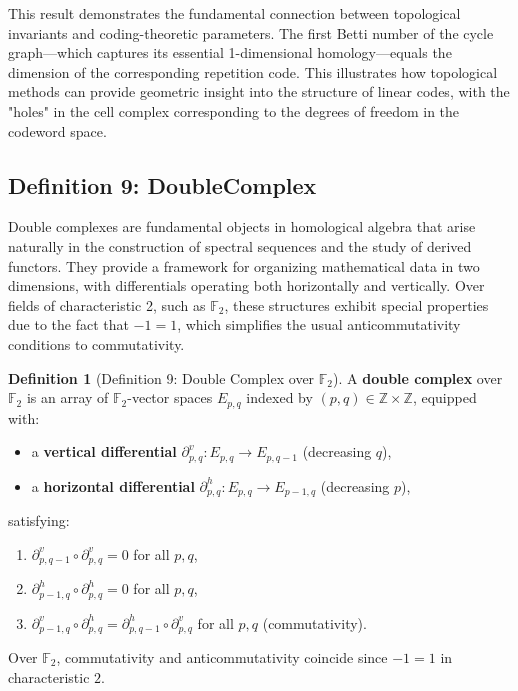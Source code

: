 \documentclass[11pt]{article}
\theoremstyle{plain}
\theoremstyle{definition}
\newtheorem*{definition}{Definition}
\theoremstyle{remark}
\begin{document}
This result demonstrates the fundamental connection between topological invariants and coding-theoretic parameters. The first Betti number of the cycle graph—which captures its essential 1-dimensional homology—equals the dimension of the corresponding repetition code. This illustrates how topological methods can provide geometric insight into the structure of linear codes, with the "holes" in the cell complex corresponding to the degrees of freedom in the codeword space.

\vspace{1em}

\subsection{Definition 9: DoubleComplex}

Double complexes are fundamental objects in homological algebra that arise naturally in the construction of spectral sequences and the study of derived functors. They provide a framework for organizing mathematical data in two dimensions, with differentials operating both horizontally and vertically. Over fields of characteristic 2, such as $\mathbb{F}_2$, these structures exhibit special properties due to the fact that $-1 = 1$, which simplifies the usual anticommutativity conditions to commutativity.

\begin{definition}[Definition 9: Double Complex over $\mathbb{F}_2$]
A \textbf{double complex} over $\mathbb{F}_2$ is an array of $\mathbb{F}_2$-vector spaces $E_{p,q}$ indexed by $(p,q) \in \mathbb{Z} \times \mathbb{Z}$, equipped with:
\begin{itemize}
    \item a \textbf{vertical differential} $\partial^v_{p,q} : E_{p,q} \to E_{p,q-1}$ (decreasing $q$),
    \item a \textbf{horizontal differential} $\partial^h_{p,q} : E_{p,q} \to E_{p-1,q}$ (decreasing $p$),
\end{itemize}
satisfying:
\begin{enumerate}
    \item $\partial^v_{p,q-1} \circ \partial^v_{p,q} = 0$ for all $p, q$,
    \item $\partial^h_{p-1,q} \circ \partial^h_{p,q} = 0$ for all $p, q$,
    \item $\partial^v_{p-1,q} \circ \partial^h_{p,q} = \partial^h_{p,q-1} \circ \partial^v_{p,q}$ for all $p, q$ (commutativity).
\end{enumerate}
Over $\mathbb{F}_2$, commutativity and anticommutativity coincide since $-1 = 1$ in characteristic $2$.
\end{definition}
\end{document}
